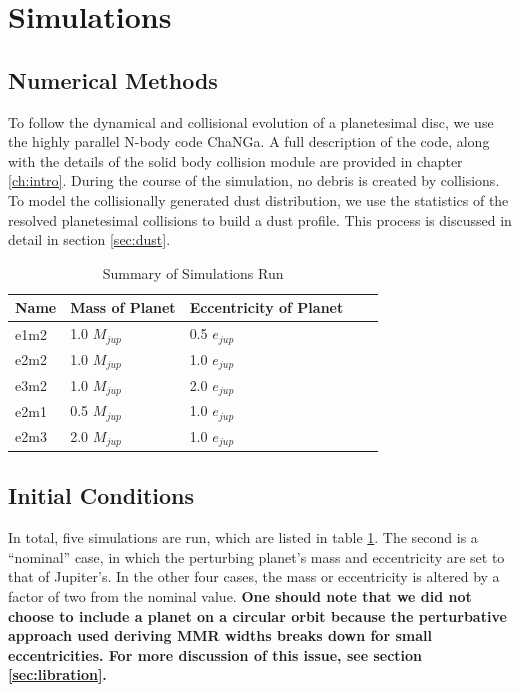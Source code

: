 \section{Simulations} \label{sec:sims}

\subsection{Numerical Methods}\label{sec:methods}

To follow the dynamical and collisional evolution of a planetesimal disc, we use the highly parallel N-body code {\sc ChaNGa}. A full 
description of the code, along with the details of the solid body collision module are provided in chapter \ref{ch:intro}. During the course 
of the simulation, no debris is created by collisions. To model the collisionally generated dust distribution, we use the statistics of the 
resolved planetesimal collisions to build a dust profile. This process is discussed in detail in section \ref{sec:dust}.

\begin{table}
\begin{center}
\caption{Summary of Simulations Run}
\begin{tabular}{lllll} \hline \hline
Name     & Mass of Planet & Eccentricity of Planet &  &  \\ \hline
e1m2 & 1.0 $M_{jup}$                     & 0.5 $e_{jup}$                            &  &  \\
e2m2      & 1.0 $M_{jup}$                     & 1.0 $e_{jup}$                             &  &  \\
e3m2 & 1.0 $M_{jup}$                     & 2.0 $e_{jup}$                             &  &  \\
e2m1 & 0.5 $M_{jup}$                   & 1.0 $e_{jup}$                             &  &  \\
e2m3 & 2.0 $M_{jup}$                     & 1.0 $e_{jup}$                             &  &  \\ \hline
\end{tabular}
\label{tab:sims}
\end{center}
\end{table}

\subsection{Initial Conditions}\label{sec:jup_ics}

In total, five simulations are run, which are listed in table \ref{tab:sims}. The second is a ``nominal'' case, in which the perturbing 
planet's mass and eccentricity are set to that of Jupiter's. In the other four cases, the mass or eccentricity is altered by a factor of 
two from the nominal value. \textbf{One should note that we did not choose to include a planet on a circular orbit because the perturbative approach used deriving MMR widths breaks down for small eccentricities. For more discussion of this issue, see section \ref{sec:libration}.} 

